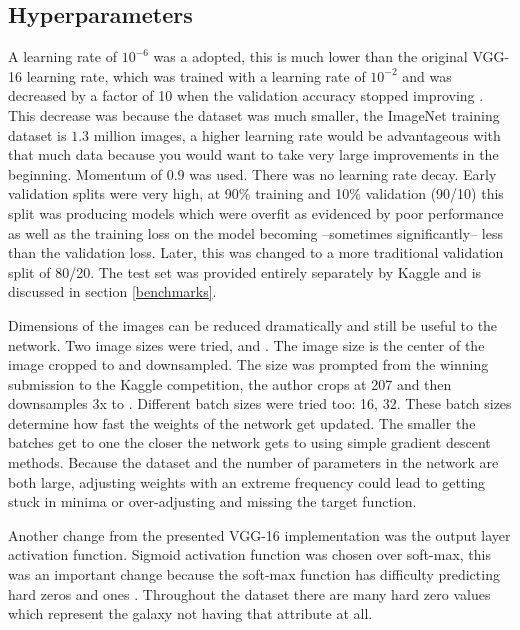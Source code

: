 \subsection{Hyperparameters}

A learning rate of $10^{{-6}}$ was a adopted, this is much lower than the original VGG-16 learning rate, which was trained with a learning rate of $10^{{-2}}$ and was decreased by a factor of 10 when the validation accuracy stopped improving \cite{vgg16-arxiv}. This decrease was because the dataset was much smaller, the ImageNet training dataset is $1.3$ million images, a higher learning rate would be advantageous with that much data because you would want to take very large improvements in the beginning. Momentum of $0.9$ was used. There was no learning rate decay. Early validation splits were very high, at 90\% training and 10\% validation (90/10) this split was producing models which were overfit as evidenced by poor performance as well as the training loss on the model becoming --sometimes significantly-- less than the validation loss. Later, this was changed to a more traditional validation split of 80/20. The test set was provided entirely separately by Kaggle and is discussed in section \ref{benchmarks}.

Dimensions of the images can be reduced dramatically and still be useful to the network. Two image sizes were tried,  and . The  image size is the center of the image cropped to  and downsampled. The  size was prompted from the winning submission to the Kaggle competition, the author crops at 207 and then downsamples 3x to  \cite{kaggle-winner}. Different batch sizes were tried too: 16, 32. These batch sizes determine how fast the weights of the network get updated. The smaller the batches get to one the closer the network gets to using simple gradient descent methods. Because the dataset and the number of parameters in the network are both large, adjusting weights with an extreme frequency could lead to getting stuck in minima or over-adjusting and missing the target function.

Another change from the presented VGG-16 implementation was the output layer activation function. Sigmoid activation function was chosen over soft-max, this was an important change because the soft-max function has difficulty predicting hard zeros and ones \cite{kaggle-winner}. Throughout the dataset there are many hard zero values which represent the galaxy not having that attribute at all.

